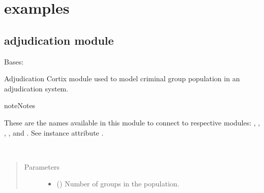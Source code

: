 \documentclass[letterpaper,10pt,openany,oneside,english]{sphinxmanual}
\begin{document}
\chapter{examples}
\label{\detokenize{examples_rst/modules:examples}}\label{\detokenize{examples_rst/modules::doc}}

\section{adjudication module}
\label{\detokenize{examples_rst/adjudication:module-adjudication}}\label{\detokenize{examples_rst/adjudication:adjudication-module}}\label{\detokenize{examples_rst/adjudication::doc}}

\begin{fulllineitems}
\label{\detokenize{examples_rst/adjudication:adjudication.Adjudication}}
Bases: 

Adjudication Cortix module used to model criminal group population in an
adjudication system.

\begin{sphinxadmonition}{note}{Notes}

These are the  names available in this module to connect to respective
modules: , , , , and .
See instance attribute .
\end{sphinxadmonition}

\begin{fulllineitems}
\label{\detokenize{examples_rst/adjudication:adjudication.Adjudication.__init__}}~\begin{quote}\begin{description}
\item[{Parameters}] \leavevmode\begin{itemize}
\item {} 
 () \textendash{} Number of groups in the population.


\end{itemize}
\end{description}
\end{quote}
\end{fulllineitems}
\end{fulllineitems}
\end{document}
